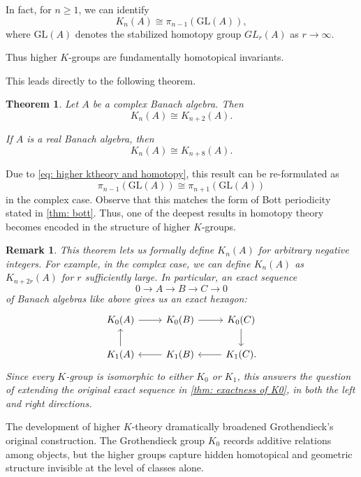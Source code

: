 \documentclass[12pt,reqno]{amsart}
\theoremstyle{plain}
\newtheorem{rem}[thm]{Remark}
\numberwithin{equation}{section}
\newtheorem{theorem}{Theorem}[section]
\begin{document}
In fact, for $n\ge 1$, we can identify
\begin{equation}\label{eq: higher ktheory and homotopy}
K_n(A) \cong \pi_{n-1}(\mathrm{GL}(A)), 
\end{equation}
where $\mathrm{GL}(A)$ denotes the stabilized homotopy group $GL_r(A)$ as $r\to \infty$.

Thus higher $K$-groups are fundamentally homotopical invariants.

This leads directly to the following theorem.

\begin{theorem}
Let $A$ be a complex Banach algebra. Then
\[
K_n(A)\cong K_{n+2}(A).
\]

If $A$ is a real Banach algebra, then
\[
K_n(A)\cong K_{n+8}(A).
\]
\end{theorem}

Due to \eqref{eq: higher ktheory and homotopy}, this result can be re-formulated as
\[
\pi_{n-1}(\mathrm{GL}(A))
\cong
\pi_{n+1}(\mathrm{GL}(A))
\]
in the complex case. Observe that this matches the form of Bott periodicity stated in \cref{thm: bott}. Thus, one of the deepest results in homotopy theory becomes encoded in the structure of higher $K$-groups.




\begin{rem}
    This theorem lets us formally define $K_n(A)$ for arbitrary negative integers. For example, in the complex case, we can define $K_n(A)$ as $K_{n+2r}(A)$ for $r$ sufficiently large. In particular, an exact sequence
    \[0 \longrightarrow A \longrightarrow B\longrightarrow C\longrightarrow 0\]
    of Banach algebras like above gives us an exact \textit{hexagon}:
    \[\begin{tikzcd}
 K_0(A) \arrow[r]& K_0(B) \arrow[r]  & K_0(C)\arrow[d]\\
 K_1(A) \arrow[u]& K_1(B)   \arrow[l] & K_1(C). \arrow[l]
    \end{tikzcd}\]
    Since every $K$-group is isomorphic to either $K_0$ or $K_1$, this answers the question of extending the original exact sequence in \cref{thm: exactness of K0}, in both the left and right directions.
\end{rem}



\medskip
The development of higher $K$-theory dramatically broadened Grothendieck's original construction. The Grothendieck group $K_0$ records additive relations among objects, but the higher groups capture hidden homotopical and geometric structure invisible at the level of classes alone.
\end{document}
